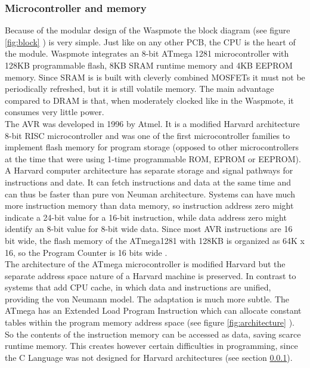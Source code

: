 \subsubsection{Microcontroller and memory}
\label{memory}
Because of the modular design of the Waspmote the block diagram (see figure \ref{fig:block} \label{fig13}) is very simple. Just like on any other PCB, the CPU is the heart of the module. Waspmote integrates an 8-bit ATmega 1281 microcontroller with 128KB programmable flash, 8KB SRAM runtime memory and 4KB EEPROM memory. Since SRAM is is built with cleverly combined MOSFETs it must not be periodically refreshed, but it is still volatile memory. The main advantage compared to DRAM is that, when moderately clocked like in the Waspmote, it consumes very little power.\\
The AVR was developed in 1996 by Atmel. It is a modified Harvard architecture 8-bit RISC microcontroller and was one of the first microcontroller families to implement flash memory for program storage (opposed to other microcontrollers at the time that were using 1-time programmable ROM, EPROM or EEPROM).\\
A Harvard computer architecture has separate storage and signal pathways for instructions and date. It can fetch instructions and data at the same time and can thus be faster than pure von Neuman architecture. Systems can have much more instruction memory than data memory, so instruction address zero might indicate a 24-bit value for a 16-bit instruction, while data address zero might identify an 8-bit value for 8-bit wide data. Since most AVR instructions are 16 bit wide, the flash memory of the ATmega1281 with 128KB is organized as 64K x 16, so the Program Counter is 16 bits wide .\\
The architecture of the ATmega microcontroller is modified Harvard but the separate address space nature of a Harvard machine is preserved. In contrast to systems that add CPU cache, in which data and instructions are unified, providing the von Neumann model. The adaptation is much more subtle. The ATmega has an Extended Load Program Instruction which can allocate constant tables within the program memory address space (see figure \ref{fig:architecture} \label{fig14}). So the contents of the instruction memory can be accessed as data, saving scarce runtime memory. This creates however certain difficulties in programming, since the C Language was not designed for Harvard architectures (see section \ref{memory}). 
